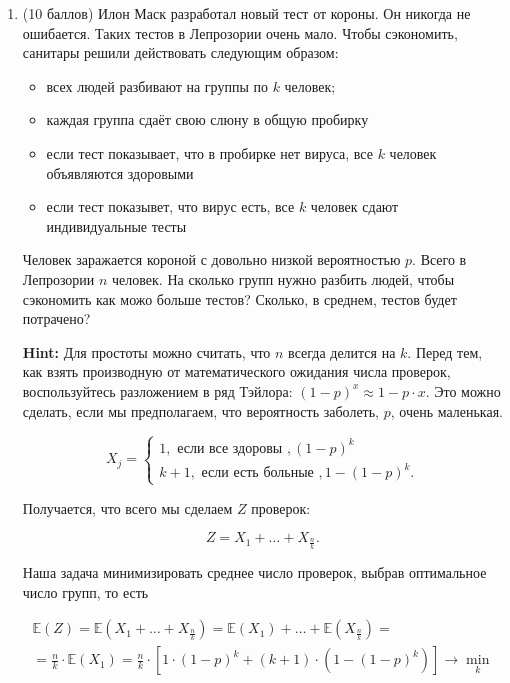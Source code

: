 \documentclass[12pt]{article}
\newenvironment{solution}{}{}
\begin{document}
\begin{enumerate}
    \item (10 баллов) Илон Маск разработал новый тест от короны. Он никогда не ошибается. Таких тестов в Лепрозории очень мало. Чтобы сэкономить, санитары решили действовать следующим образом: 
    
    \begin{itemize} 
        \item всех людей разбивают на группы по $k$ человек;
        \item каждая группа сдаёт свою слюну в общую пробирку
        \item если тест показывает, что в пробирке нет вируса, все $k$ человек объявляются здоровыми
        \item если тест показывет, что вирус есть, все $k$ человек сдают индивидуальные тесты
    \end{itemize}
    
    Человек заражается короной с довольно низкой вероятностью $p$. Всего в Лепрозории $n$ человек. На сколько групп нужно разбить людей, чтобы сэкономить как можо больше тестов? Сколько, в среднем, тестов будет потрачено? 
    
    \textbf{Hint:} Для простоты можно считать, что $n$ всегда делится на $k$. Перед тем, как взять производную от математического ожидания числа проверок, воспользуйтесь разложением в ряд Тэйлора: $(1 - p)^x \approx 1 - p \cdot x$. Это можно сделать, если мы предполагаем, что вероятность заболеть, $p$, очень маленькая.  
    
\begin{solution} 
    \begin{equation*}
        X_j = \begin{cases} 
        1, \text{ если все здоровы }, (1 - p)^k \\
        k + 1, \text{ если есть больные }, 1 - (1 - p)^k.
        \end{cases}
    \end{equation*} 
    
    Получается, что всего мы сделаем $Z$ проверок:
    
    $$
    Z = X_1 + \ldots + X_{\frac{n}{k}}.
    $$ 
    
    Наша задача минимизировать среднее число проверок, выбрав оптимальное число групп, то есть
    
    \begin{multline*}
        \mathbb{E}(Z) = \mathbb{E}(X_1 + \ldots + X_{\frac{n}{k}}) = \mathbb{E}(X_1) + \ldots +  \mathbb{E}(X_{\frac{n}{k}}) = \\ =\frac{n}{k} \cdot \mathbb{E}(X_1) = \frac{n}{k} \cdot \left[1 \cdot (1-p)^k + (k+1) \cdot (1 - (1 - p)^k) \right] \to \min_k 
    \end{multline*}


\end{solution}
\end{enumerate}
\end{document}
